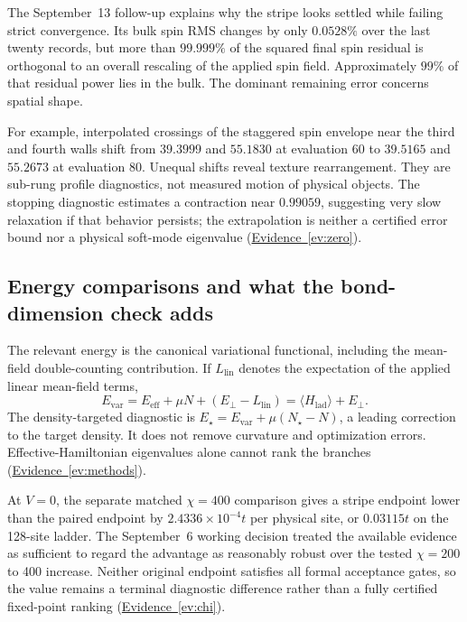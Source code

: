 \documentclass[11pt,letterpaper]{article}
\newcommand{\avg}[1]{\langle #1\rangle}
\newcommand{\ev}[1]{\hyperref[ev:#1]{Evidence~\ref*{ev:#1}}}
\begin{document}
The September~13 follow-up explains why the stripe looks settled while
failing strict convergence. Its bulk spin RMS changes by only $0.0528\%$
over the last twenty records, but more than $99.999\%$ of the squared
final spin residual is orthogonal to an overall rescaling of the applied
spin field. Approximately $99\%$ of that residual power lies in the bulk.
The dominant remaining error concerns spatial shape.

For example, interpolated crossings of the staggered spin envelope near the
third and fourth walls shift from $39.3999$ and $55.1830$ at evaluation 60
to $39.5165$ and $55.2673$ at evaluation 80. Unequal shifts reveal texture
rearrangement. They are sub-rung profile diagnostics, not measured motion of
physical objects. The stopping diagnostic estimates a contraction near
$0.99059$, suggesting very slow relaxation if that behavior persists;
the extrapolation is neither a certified error bound nor a physical soft-mode
eigenvalue (\ev{zero}).

\subsection{Energy comparisons and what the bond-dimension check adds}

The relevant energy is the canonical variational functional, including the
mean-field double-counting contribution. If $L_{\mathrm{lin}}$ denotes
the expectation of the applied linear mean-field terms,
\begin{equation}
 E_{\mathrm{var}}=E_{\mathrm{eff}}+\mu N+
          (E_{\perp}-L_{\mathrm{lin}})
       =\avg{H_{\mathrm{lad}}}+E_{\perp}.
 \label{eq:energy}
\end{equation}
The density-targeted diagnostic is
$E_\star=E_{\mathrm{var}}+\mu(N_\star-N)$, a leading correction to the
target density. It does not remove curvature and optimization errors.
Effective-Hamiltonian eigenvalues alone cannot rank the branches
(\ev{methods}).

At $V=0$, the separate matched $\chi=400$ comparison gives a stripe endpoint
lower than the paired endpoint by $2.4336\times10^{-4}t$ per physical
site, or $0.03115t$ on the 128-site ladder. The September~6 working decision
treated the available evidence as sufficient to regard the advantage as
reasonably robust over the tested $\chi=200$ to 400 increase. Neither
original endpoint satisfies all formal acceptance gates, so the value
remains a terminal diagnostic difference rather than a fully certified
fixed-point ranking (\ev{chi}).
\end{document}
